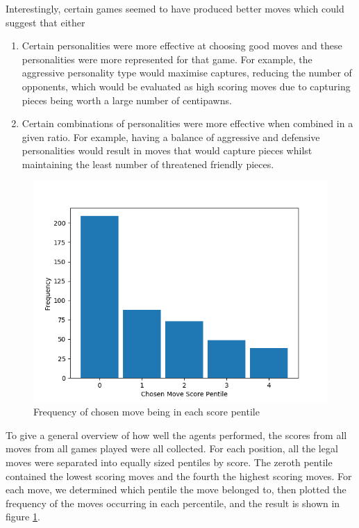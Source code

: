 \documentclass{article}
\begin{document}
Interestingly, certain games seemed to have produced better moves which could suggest that either 
\begin{enumerate}
	\item Certain personalities were more effective at choosing good moves and these personalities were more represented for that game. For example, the aggressive personality type would maximise captures, reducing the number of opponents, which would be evaluated as high scoring moves due to capturing pieces being worth a large number of centipawns.

	\item Certain combinations of personalities were more effective when combined in a given ratio. For example, having a balance of aggressive and defensive personalities would result in moves that would capture pieces whilst maintaining the least number of threatened friendly pieces.
\end{enumerate}

\begin{figure}[]
	\centering
	\includegraphics[width=0.8\linewidth ]{images/frequency}
	\caption{Frequency of chosen move being in each score pentile}
	\label{fig:frequency}
\end{figure}

To give a general overview of how well the agents performed, the scores from all moves from all games played were all collected. For each position, all the legal moves were separated into equally sized pentiles by score. The zeroth pentile contained the lowest scoring moves and the fourth the highest scoring moves. For each move, we determined which pentile the move belonged to, then plotted the frequency of the moves occurring in each percentile, and the result is shown in figure \ref{fig:frequency}.
\end{document}
